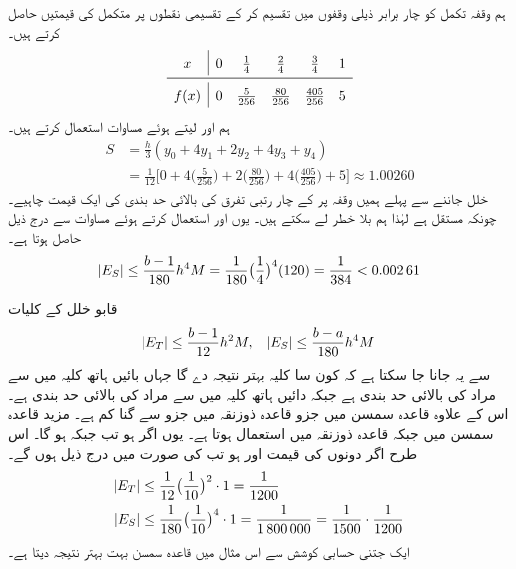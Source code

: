 ہم وقفہ تکمل کو چار برابر ذیلی وقفوں میں تقسیم کر کے تقسیمی نقطوں پر متکمل  کی قیمتیں حاصل کرتے ہیں۔
\begin{align*}
\renewcommand{\arraystretch}{1.5} 
\begin{array}{c|ccccc}
x&0&\frac{1}{4}&\frac{2}{4}&\frac{3}{4}&1\\
\midrule
f(x)&0&\frac{5}{256}&\frac{80}{256}&\frac{405}{256}&5
\end{array}
\end{align*}
ہم  اور  لیتے ہوئے مساوات  استعمال کرتے ہیں۔
\begin{align*}
S&=\frac{h}{3}(y_0+4y_1+2y_2+4y_3+y_4)\\
&=\frac{1}{12}\big[0+4\big(\frac{5}{256}\big)+2\big(\frac{80}{256}\big)+4\big(\frac{405}{256}\big)+5\big]\approx \num{1.00260}
\end{align*}
خلل جاننے سے پہلے ہمیں وقفہ  پر   کے چار  رتبی تفرق  کی بالائی حد بندی کی ایک قیمت  چاہیے۔ چونکہ  مستقل ہے لہٰذا ہم بلا خطر  لے سکتے ہیں۔ یوں  اور  استعمال کرتے ہوئے مساوات  سے درج ذیل حاصل ہوتا ہے۔
\begin{align*}
\abs{E_S}\le\frac{b-1}{180}h^4M=\frac{1}{180}\big(\frac{1}{4}\big)^4(120)=\frac{1}{384}<\num{0.00261} 
\end{align*}

قابو خلل کے کلیات 
\begin{align*}
\abs{E_T}\le \frac{b-1}{12}h^2M,\quad \abs{E_S}\le \frac{b-a}{180}h^4M
\end{align*}
سے یہ جانا جا سکتا ہے کہ کون سا کلیہ بہتر نتیجہ دے گا جہاں بائیں ہاتھ کلیہ میں سے مراد  کی بالائی حد بندی ہے جبکہ دائیں ہاتھ کلیہ میں  سے مراد  کی بالائی حد بندی ہے۔ اس کے علاوہ قاعدہ سمسن میں جزو   قاعدہ ذوزنقہ میں جزو  سے  گنا کم ہے۔ مزید قاعدہ سمسن میں  جبکہ قاعدہ ذوزنقہ میں  استعمال ہوتا ہے۔ یوں اگر  ہو تب  جبکہ  ہو گا۔ اس طرح اگر دونوں  کی قیمت  اور   ہو  تب  کی صورت میں  درج ذیل ہوں گے۔
\begin{align*}
\abs{E_T}&\le \frac{1}{12}\big(\frac{1}{10}\big)^2\cdot 1=\frac{1}{1200}\\
\abs{E_S}&\le \frac{1}{180}\big(\frac{1}{10}\big)^4\cdot 1=\frac{1}{\num{1800000}}=\frac{1}{1500}\cdot \frac{1}{1200}
\end{align*}
ایک جتنی حسابی کوشش سے اس مثال میں  قاعدہ سمسن بہت بہتر نتیجہ دیتا ہے۔

